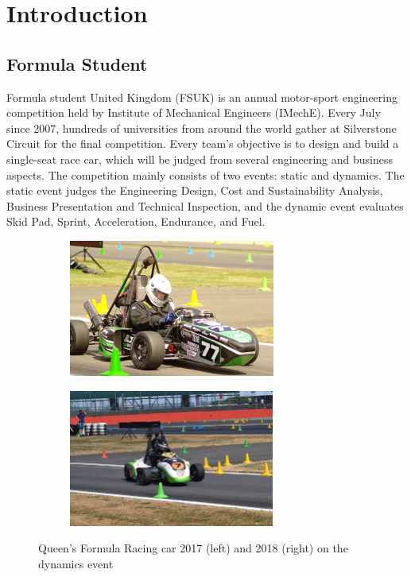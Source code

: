 \newpage
\setcounter{page}{1}
\justifying
\noindent

\section{Introduction}
\subsection{Formula Student}
Formula student United Kingdom (FSUK) is an annual motor-sport engineering competition held by Institute of Mechanical Engineers (IMechE). Every July since 2007, hundreds of universities from around the world gather at Silverstone Circuit for the final competition. Every team's objective is to design and build a single-seat race car, which will be judged from several engineering and business aspects. The competition mainly consists of two events: static and dynamics. The static event judges the Engineering  Design,  Cost and  Sustainability  Analysis, Business Presentation and Technical Inspection, and the dynamic event evaluates Skid Pad, Sprint, Acceleration, Endurance, and Fuel.

\begin{figure}[!ht]
\begin{center}
%    
  \begin{subfigure}[b]{0.45\textwidth}
    \includegraphics[height=4.5cm]{Figures/QFR17PHOTO.JPG}
  \end{subfigure}
  \begin{subfigure}[b]{0.45\textwidth}
    \includegraphics[height=4.5cm]{Figures/QFR18PHOTO.jpg}
  \end{subfigure}
%  
  \caption{Queen's Formula Racing car 2017 (left) and 2018 (right) on the dynamics event}
    \label{fig:1}
\end{center}
\end{figure}

